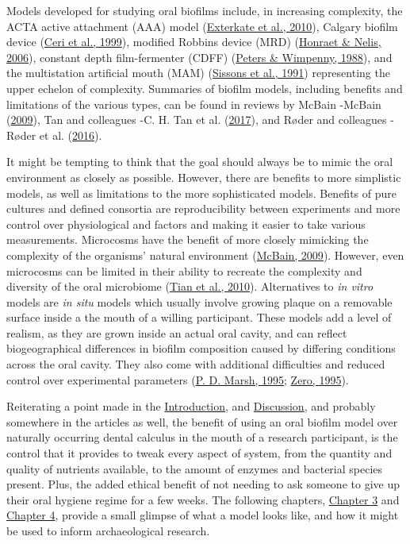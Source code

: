 \documentclass[
  letterpaper,
]{book}
\begin{document}
Models developed for studying oral biofilms include, in increasing
complexity, the ACTA active attachment (AAA) model
(\protect\hyperlink{ref-extercateAAA2010}{Exterkate et al., 2010}),
Calgary biofilm device
(\protect\hyperlink{ref-ceriCalgaryBiofilm1999}{Ceri et al., 1999}),
modified Robbins device (MRD)
(\protect\hyperlink{ref-honraetModifiedRobbins2006}{Honraet \& Nelis,
2006}), constant depth film-fermenter (CDFF)
(\protect\hyperlink{ref-petersConstantDepth1988}{Peters \& Wimpenny,
1988}), and the multistation artificial mouth (MAM)
(\protect\hyperlink{ref-sissonsMultistationPlaque1991}{Sissons et al.,
1991}) representing the upper echelon of complexity. Summaries of
biofilm models, including benefits and limitations of the various types,
can be found in reviews by McBain -McBain
(\protect\hyperlink{ref-mcbainBiofilmModels2009}{2009}), Tan and
colleagues -C. H. Tan et al.
(\protect\hyperlink{ref-tanAllTogether2017}{2017}), and Røder and
colleagues -Røder et al.
(\protect\hyperlink{ref-roderStudyingBacterial2016}{2016}).

It might be tempting to think that the goal should always be to mimic
the oral environment as closely as possible. However, there are benefits
to more simplistic models, as well as limitations to the more
sophisticated models. Benefits of pure cultures and defined consortia
are reproducibility between experiments and more control over
physiological and factors and making it easier to take various
measurements. Microcosms have the benefit of more closely mimicking the
complexity of the organisms' natural environment
(\protect\hyperlink{ref-mcbainBiofilmModels2009}{McBain, 2009}).
However, even microcosms can be limited in their ability to recreate the
complexity and diversity of the oral microbiome
(\protect\hyperlink{ref-tianUsingDGGE2010}{Tian et al., 2010}).
Alternatives to \emph{in vitro} models are \emph{in situ} models which
usually involve growing plaque on a removable surface inside a the mouth
of a willing participant. These models add a level of realism, as they
are grown inside an actual oral cavity, and can reflect biogeographical
differences in biofilm composition caused by differing conditions across
the oral cavity. They also come with additional difficulties and reduced
control over experimental parameters
(\protect\hyperlink{ref-marshRoleMicrobiology1995}{P. D. Marsh, 1995};
\protect\hyperlink{ref-zeroSituCaries1995}{Zero, 1995}).

Reiterating a point made in the
\protect\hyperlink{chap-intro}{Introduction}, and
\protect\hyperlink{chap-discussion}{Discussion}, and probably somewhere
in the articles as well, the benefit of using an oral biofilm model over
naturally occurring dental calculus in the mouth of a research
participant, is the control that it provides to tweak every aspect of
system, from the quantity and quality of nutrients available, to the
amount of enzymes and bacterial species present. Plus, the added ethical
benefit of not needing to ask someone to give up their oral hygiene
regime for a few weeks. The following chapters,
\protect\hyperlink{byoc-valid}{Chapter 3} and
\protect\hyperlink{byoc-starch}{Chapter 4}, provide a small glimpse of
what a model looks like, and how it might be used to inform
archaeological research.
\end{document}
